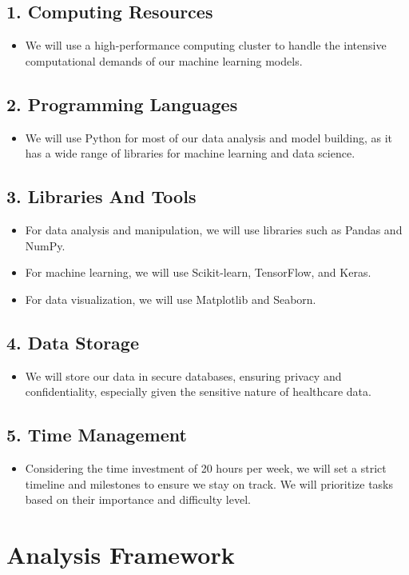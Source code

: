 \documentclass[conference]{IEEEtran}
\begin{document}
\subsection{1. Computing Resources}
\begin{itemize}
\item We will use a high-performance computing cluster to handle the intensive computational demands of our machine learning models.
\end{itemize}
\subsection{2. Programming Languages}
\begin{itemize}
\item We will use Python for most of our data analysis and model building, as it has a wide range of libraries for machine learning and data science.
\end{itemize}
\subsection{3. Libraries And Tools}
\begin{itemize}
\item For data analysis and manipulation, we will use libraries such as Pandas and NumPy.
\item For machine learning, we will use Scikit-learn, TensorFlow, and Keras.
\item For data visualization, we will use Matplotlib and Seaborn.
\end{itemize}
\subsection{4. Data Storage}
\begin{itemize}
\item We will store our data in secure databases, ensuring privacy and confidentiality, especially given the sensitive nature of healthcare data.
\end{itemize}
\subsection{5. Time Management}
\begin{itemize}
\item Considering the time investment of 20 hours per week, we will set a strict timeline and milestones to ensure we stay on track. We will prioritize tasks based on their importance and difficulty level.
\end{itemize}

\section{ Analysis Framework }
\end{document}
